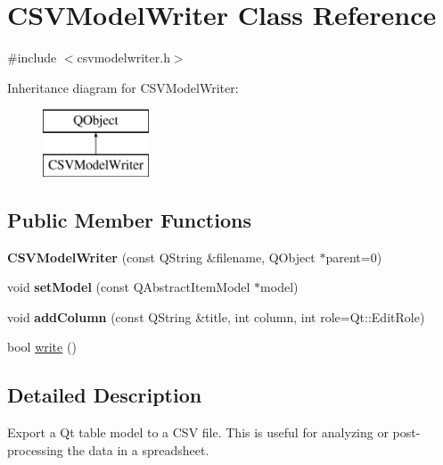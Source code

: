 \hypertarget{class_c_s_v_model_writer}{}\section{C\+S\+V\+Model\+Writer Class Reference}
\label{class_c_s_v_model_writer}


{\ttfamily \#include $<$csvmodelwriter.\+h$>$}

Inheritance diagram for C\+S\+V\+Model\+Writer\+:\begin{figure}[H]
\begin{center}
\leavevmode
\includegraphics[height=2.000000cm]{class_c_s_v_model_writer}
\end{center}
\end{figure}
\subsection*{Public Member Functions}
\begin{DoxyCompactItemize}
\item 
\mbox{\label{class_c_s_v_model_writer_a343d5ebba512dea41a62e11e45a6d175}} 
{\bfseries C\+S\+V\+Model\+Writer} (const Q\+String \&filename, Q\+Object $\ast$parent=0)
\item 
\mbox{\label{class_c_s_v_model_writer_a7b8be6f49a66b965a94a89c78fb96e40}} 
void {\bfseries set\+Model} (const Q\+Abstract\+Item\+Model $\ast$model)
\item 
\mbox{\label{class_c_s_v_model_writer_a9e5f0d60f2c873747582ce21ddeb53b5}} 
void {\bfseries add\+Column} (const Q\+String \&title, int column, int role=Qt\+::\+Edit\+Role)
\item 
bool \mbox{\hyperlink{class_c_s_v_model_writer_a71fe52fdd6f41c506f9631175cb04615}{write}} ()
\end{DoxyCompactItemize}


\subsection{Detailed Description}
Export a Qt table model to a C\+SV file. This is useful for analyzing or post-\/processing the data in a spreadsheet. 

